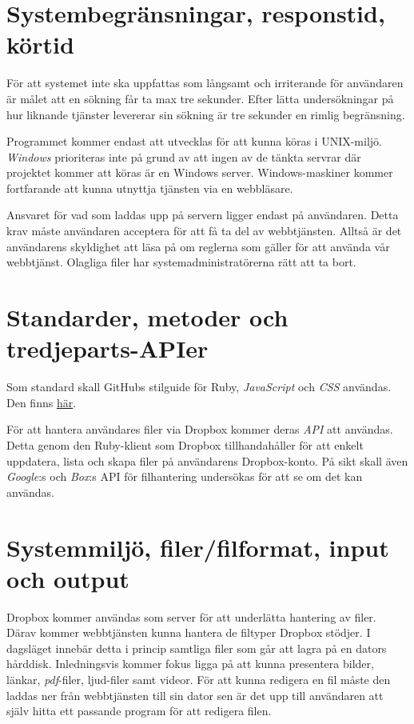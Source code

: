 \documentclass[a4paper,12pt,oneside,final]{extbook}
\begin{document}
\section{Systembegränsningar, responstid, körtid}
För att systemet inte ska uppfattas som långsamt och irriterande för användaren
är målet att en sökning får ta max tre sekunder. Efter lätta undersökningar på
hur liknande tjänster levererar sin sökning är tre sekunder en rimlig begränsning.

Programmet kommer endast att utvecklas för att kunna köras i UNIX-miljö.
\emph{Windows} prioriteras inte på grund av att ingen av de tänkta servrar där
projektet kommer att köras är en Windows server. Windows-maskiner kommer
fortfarande att kunna utnyttja tjänsten via en webbläsare.

Ansvaret för vad som laddas upp på servern ligger endast på användaren.
Detta krav måste användaren acceptera för att få ta del av webbtjänsten.
Alltså är det användarens skyldighet att läsa på om reglerna som gäller för
att använda vår webbtjänst. Olagliga filer har systemadministratörerna rätt
att ta bort.

\section{Standarder, metoder och tredjeparts-APIer}
Som standard skall GitHubs stilguide för Ruby, \emph{JavaScript} och \emph{CSS}
användas. Den finns \href{https://github.com/styleguide}{här}.

För att hantera användares filer via Dropbox kommer deras \emph{API} att användas.
Detta genom den Ruby-klient som Dropbox tillhandahåller för att enkelt uppdatera,
lista och skapa filer på användarens Dropbox-konto. På sikt skall även \emph{Google}:s
och \emph{Box}:s API för filhantering undersökas för att se om det kan användas.

\section{Systemmiljö, filer/filformat, input och output}
Dropbox kommer användas som server för att underlätta hantering av filer. Därav
kommer webbtjänsten kunna hantera de filtyper Dropbox stödjer. I dagsläget innebär
detta i princip samtliga filer som går att lagra på en dators hårddisk.
Inledningsvis kommer fokus ligga på att kunna presentera bilder, länkar, \emph{pdf}-filer,
ljud-filer samt videor. För att kunna redigera en fil måste den laddas ner från
webbtjänsten till sin dator sen är det upp till användaren att själv hitta ett
passande program för att redigera filen.
\end{document}
